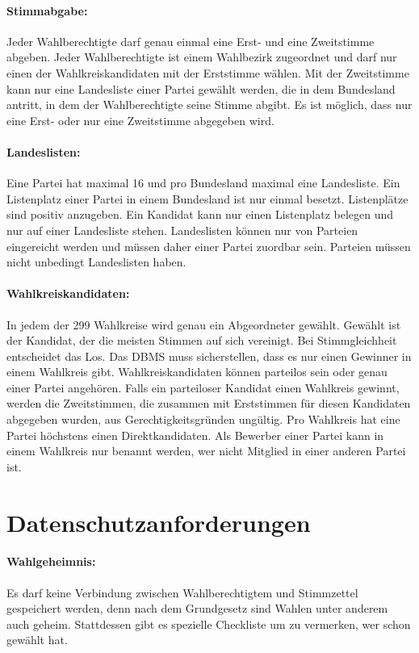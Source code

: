 \documentclass[a4paper]{article}
\begin{document}
\paragraph{Stimmabgabe:} Jeder Wahlberechtigte darf genau einmal eine Erst- und eine Zweitstimme abgeben. Jeder Wahlberechtigte ist einem Wahlbezirk zugeordnet und darf nur einen der Wahlkreiskandidaten mit der Erststimme wählen. Mit der Zweitstimme kann nur eine Landesliste einer Partei gewählt werden, die in dem Bundesland antritt, in dem der Wahlberechtigte seine Stimme abgibt. Es ist möglich, dass nur eine Erst- oder nur eine Zweitstimme abgegeben wird.

\paragraph{Landeslisten:} Eine Partei hat maximal 16 und pro Bundesland maximal eine Landesliste. Ein Listenplatz einer Partei in einem Bundesland ist nur einmal besetzt. Listenplätze sind positiv anzugeben. Ein Kandidat kann nur einen Listenplatz belegen und nur auf einer Landesliste stehen. Landeslisten können nur von Parteien eingereicht werden und müssen daher einer Partei zuordbar sein. Parteien müssen nicht unbedingt Landeslisten haben.

\paragraph{Wahlkreiskandidaten:} In jedem der 299 Wahlkreise wird genau ein Abgeordneter gewählt. Gewählt ist der Kandidat, der die meisten Stimmen auf sich vereinigt. Bei Stimmgleichheit entscheidet das Los. Das DBMS muss sicherstellen, dass es nur einen Gewinner in einem Wahlkreis gibt. Wahlkreiskandidaten können parteilos sein oder genau einer Partei angehören. Falls ein parteiloser Kandidat einen Wahlkreis gewinnt, werden die Zweitstimmen, die zusammen mit Erststimmen für diesen Kandidaten abgegeben wurden, aus Gerechtigkeitsgründen ungültig. Pro Wahlkreis hat eine Partei höchstens einen Direktkandidaten. Als Bewerber einer Partei kann in einem Wahlkreis nur benannt werden, wer nicht Mitglied in einer anderen Partei ist.

\section{Datenschutzanforderungen}

\paragraph{Wahlgeheimnis:} Es darf keine Verbindung zwischen Wahlberechtigtem und Stimmzettel gespeichert werden, denn nach dem Grundgesetz sind Wahlen unter anderem auch geheim. Stattdessen gibt es spezielle Checkliste um zu vermerken, wer schon gewählt hat.
\end{document}
